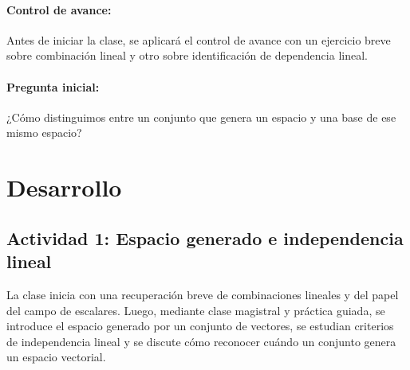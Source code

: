 \documentclass[a4,11pt]{aleph-notas}
\begin{document}
\paragraph{Control de avance:}
Antes de iniciar la clase, se aplicará el control de avance con un ejercicio breve sobre combinación lineal y otro sobre identificación de dependencia lineal.

\paragraph{Pregunta inicial:}
¿Cómo distinguimos entre un conjunto que genera un espacio y una base de ese mismo espacio?

\section*{Desarrollo}

\subsection*{Actividad 1: Espacio generado e independencia lineal}

La clase inicia con una recuperación breve de combinaciones lineales y del papel del campo de escalares. Luego, mediante clase magistral y práctica guiada, se introduce el espacio generado por un conjunto de vectores, se estudian criterios de independencia lineal y se discute cómo reconocer cuándo un conjunto genera un espacio vectorial.
\end{document}
